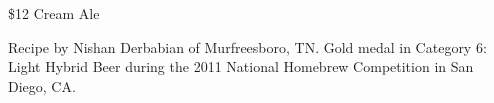 \stylesection{\stylecreamale}

\begin{recipe}{\$12 Cream Ale} %

\begin{aboutblock}
Recipe by Nishan Derbabian of Murfreesboro, TN. Gold medal in Category 6: Light
Hybrid Beer during the 2011 National Homebrew Competition in San Diego, CA.
\sourceaha
\end{aboutblock}


\begin{methodandtiming}

\begin{mashsteps}
\end{mashsteps}

\begin{fermentationsteps}
\end{fermentationsteps}

\end{methodandtiming}

\recipebreak

\begin{ingredientsblock}

\begin{malts}
\end{malts}

\begin{hops}
\end{hops}


\end{ingredientsblock}

\end{recipe}

